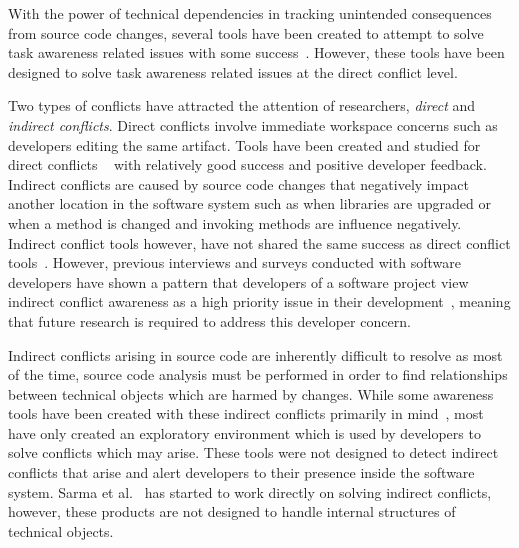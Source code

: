 With the power of technical dependencies in tracking unintended consequences from source code changes, several tools 
have been created to attempt to solve task awareness related issues with some 
success~\cite{Xiang:2008:ERT, Biehl:2007:FVD, Sarma:2009:TIV, Khurana:2009:PFC}. However, these tools have been designed 
to solve task awareness related issues at the direct conflict level. 

Two types of conflicts have attracted the attention of researchers, \textit{direct} and 
\textit{indirect conflicts}. Direct conflicts involve immediate workspace concerns such as developers editing the same
artifact. Tools have been created and studied for direct conflicts
~\cite{Xiang:2008:ERT, Biehl:2007:FVD, Sarma:2009:TIV, Khurana:2009:PFC} with relatively good success and 
positive developer feedback. Indirect conflicts are caused by source code changes that negatively impact another
location in the software system such as when libraries are upgraded or when a method is changed
and invoking methods are influence negatively. Indirect conflict tools however, have
not shared the same success as direct conflict 
tools~\cite{Sarma:2007:TSA, Holmes:2010:CAR, Trainer:2005:BGT, Servant:2010:CPI, Borici:2012:CHA}. However,
previous interviews and surveys conducted with software developers have shown a pattern that developers 
of a software project view indirect conflict awareness  as a high priority issue in their 
development~\cite{Damian:2007:GSE, Halverson:2006:DTV, Begel:2010:CDE, Schroter:2012:TTF}, meaning that future research
is required to address this developer concern.

Indirect conflicts arising in source code are inherently difficult to resolve as most of the time, source code analysis must 
be performed in order to find relationships between technical objects which are harmed by changes. While some awareness 
tools have been created with these indirect conflicts primarily in mind~\cite{Begel:2010:CDE, Trainer:2005:BGT}, most have only 
created an exploratory environment which is used by developers to solve conflicts which may arise. These tools were not designed 
to detect indirect conflicts that arise and alert developers to their presence  inside the software system. 
Sarma et al.~\cite{Sarma:2007:TSA} has started to work directly on solving indirect conflicts, however, these products are not 
designed to handle internal structures of technical objects.

